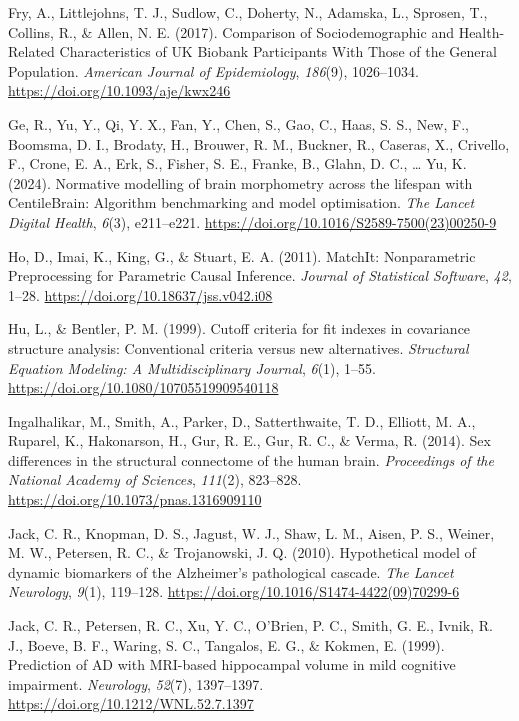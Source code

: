 \documentclass[
]{article}
\newlength{\cslhangindent}
\newenvironment{CSLReferences}[2] %
 {\begin{list}{}{%
  \setlength{\itemindent}{0pt}
  \setlength{\leftmargin}{0pt}
  \setlength{\parsep}{0pt}
  \ifodd #1
   \setlength{\leftmargin}{\cslhangindent}
   \setlength{\itemindent}{-1\cslhangindent}
  \fi
  \setlength{\itemsep}{#2\baselineskip}}}
 {\end{list}}
\begin{document}
\begin{CSLReferences}{1}{0}
Fry, A., Littlejohns, T. J., Sudlow, C., Doherty, N., Adamska, L.,
Sprosen, T., Collins, R., \& Allen, N. E. (2017). Comparison of
{Sociodemographic} and {Health}-{Related} {Characteristics} of {UK}
{Biobank} {Participants} {With} {Those} of the {General} {Population}.
\emph{American Journal of Epidemiology}, \emph{186}(9), 1026--1034.
\url{https://doi.org/10.1093/aje/kwx246}

Ge, R., Yu, Y., Qi, Y. X., Fan, Y., Chen, S., Gao, C., Haas, S. S., New,
F., Boomsma, D. I., Brodaty, H., Brouwer, R. M., Buckner, R., Caseras,
X., Crivello, F., Crone, E. A., Erk, S., Fisher, S. E., Franke, B.,
Glahn, D. C., \ldots{} Yu, K. (2024). Normative modelling of brain
morphometry across the lifespan with {CentileBrain}: Algorithm
benchmarking and model optimisation. \emph{The Lancet Digital Health},
\emph{6}(3), e211--e221.
\url{https://doi.org/10.1016/S2589-7500(23)00250-9}

Ho, D., Imai, K., King, G., \& Stuart, E. A. (2011). {MatchIt}:
{Nonparametric} {Preprocessing} for {Parametric} {Causal} {Inference}.
\emph{Journal of Statistical Software}, \emph{42}, 1--28.
\url{https://doi.org/10.18637/jss.v042.i08}

Hu, L., \& Bentler, P. M. (1999). Cutoff criteria for fit indexes in
covariance structure analysis: {Conventional} criteria versus new
alternatives. \emph{Structural Equation Modeling: A Multidisciplinary
Journal}, \emph{6}(1), 1--55.
\url{https://doi.org/10.1080/10705519909540118}

Ingalhalikar, M., Smith, A., Parker, D., Satterthwaite, T. D., Elliott,
M. A., Ruparel, K., Hakonarson, H., Gur, R. E., Gur, R. C., \& Verma, R.
(2014). Sex differences in the structural connectome of the human brain.
\emph{Proceedings of the National Academy of Sciences}, \emph{111}(2),
823--828. \url{https://doi.org/10.1073/pnas.1316909110}

Jack, C. R., Knopman, D. S., Jagust, W. J., Shaw, L. M., Aisen, P. S.,
Weiner, M. W., Petersen, R. C., \& Trojanowski, J. Q. (2010).
Hypothetical model of dynamic biomarkers of the {Alzheimer}'s
pathological cascade. \emph{The Lancet Neurology}, \emph{9}(1),
119--128. \url{https://doi.org/10.1016/S1474-4422(09)70299-6}

Jack, C. R., Petersen, R. C., Xu, Y. C., O'Brien, P. C., Smith, G. E.,
Ivnik, R. J., Boeve, B. F., Waring, S. C., Tangalos, E. G., \& Kokmen,
E. (1999). Prediction of {AD} with {MRI}-based hippocampal volume in
mild cognitive impairment. \emph{Neurology}, \emph{52}(7), 1397--1397.
\url{https://doi.org/10.1212/WNL.52.7.1397}


\end{CSLReferences}
\end{document}
